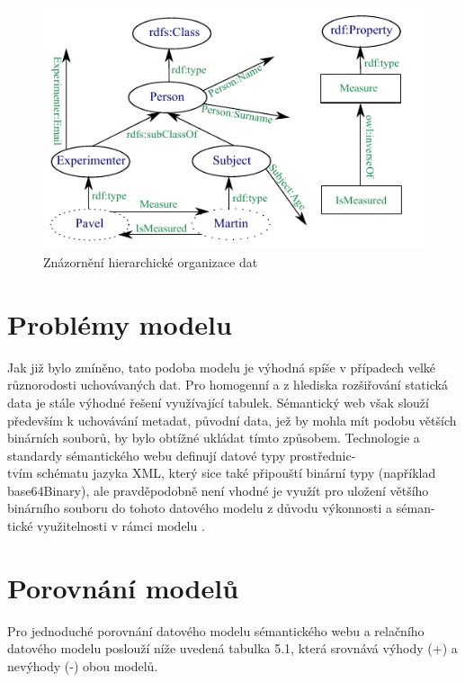 \documentclass{projekt}
\begin{document}
\begin{figure}[htb]
\begin{center}
\includegraphics[scale=1.6]{miniportal.pdf}
\caption{Znázornění hierarchické organizace dat}
\end{center}
\end{figure}

\section{Problémy modelu}
\hspace{0.65cm}Jak již bylo zmíněno, tato podoba modelu je výhodná spíše v případech velké různorodosti uchovávaných dat. Pro homogenní a z hlediska rozšiřování statická data je stále výhodné řešení využívající tabulek. Sémantický web však slouží především k uchovávání metadat, původní data, jež by mohla mít podobu větších binárních souborů, by bylo obtížné ukládat tímto způsobem. Technologie a standardy sémantického webu definují datové typy prostřednic-\\tvím schématu jazyka XML, který sice také připouští binární typy (například base64Binary), ale pravděpodobně není vhodné je využít pro uložení většího binárního souboru do tohoto datového modelu z důvodu výkonnosti a séman-\\tické využitelnosti v rámci modelu \cite{_27}.


\section{Porovnání modelů}
\hspace{0.65cm}Pro jednoduché porovnání datového modelu sémantického webu a relačního datového modelu poslouží níže uvedená tabulka 5.1, která srovnává výhody (+) a nevýhody (-) obou modelů.
\end{document}
